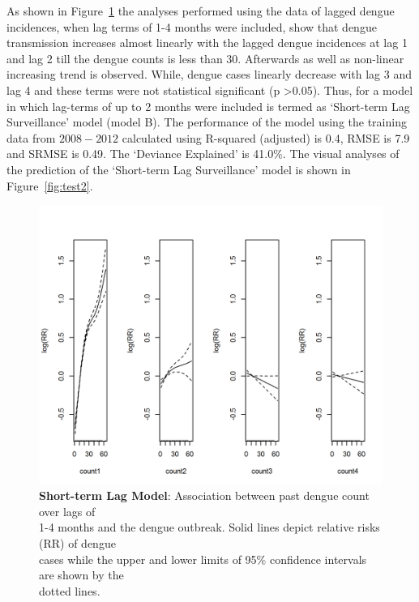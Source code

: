 \documentclass{bmcart}
\begin{document}
As shown in Figure~\ref{figure-DDShort-1} the analyses performed using the data of lagged dengue incidences, when lag terms of 1-4 months were included, show that dengue transmission increases almost linearly with the lagged dengue incidences at lag 1 and lag 2 till the dengue counts is less than 30. Afterwards as well as non-linear increasing trend is observed. While, dengue cases linearly decrease with lag 3 and lag 4 and these terms were not statistical significant (p \textgreater 0.05). Thus, for a model in which lag-terms of up to 2 months were included is termed as `Short-term Lag Surveillance' model (model B). The performance of the model using the training data from $2008-2012$ calculated using R-squared (adjusted) is 0.4, RMSE is 7.9 and SRMSE is 0.49. The `Deviance Explained' is 41.0\%. The visual analyses of the prediction of the `Short-term Lag Surveillance' model is shown in Figure~\ref{fig:test2}. 


\begin{figure}[htbp]
	\begin{center}
		\includegraphics[width= 1.0\textwidth]{7-Fit-ShortLag}
		\caption{\textbf{Short-term Lag Model}: Association between past dengue count over lags of \\ 1-4 months and the dengue outbreak. Solid lines depict relative risks (RR) of dengue  \\ cases while the upper and lower limits of 95\% confidence intervals are shown  by the \\ dotted lines.}
		\label{figure-DDShort-1}
	\end{center}
\end{figure}
\end{document}
